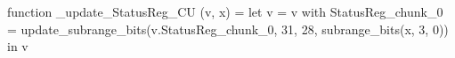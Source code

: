 function _update_StatusReg_CU (v, x) = let v = { v with StatusReg_chunk_0 = update_subrange_bits(v.StatusReg_chunk_0, 31, 28, subrange_bits(x, 3, 0)) } in
  v
